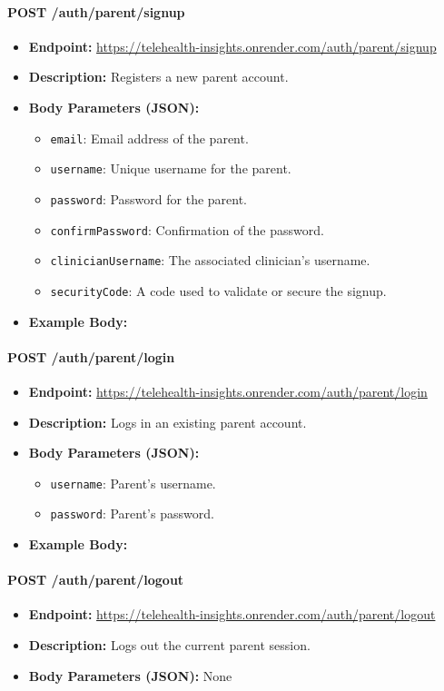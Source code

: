\documentclass{article}
\begin{document}
\paragraph{POST /auth/parent/signup}
\begin{itemize}
    \item \textbf{Endpoint:} 
        \url{https://telehealth-insights.onrender.com/auth/parent/signup}
    \item \textbf{Description:} Registers a new parent account.
    \item \textbf{Body Parameters (JSON):}
    \begin{itemize}
        \item \texttt{email}: Email address of the parent.
        \item \texttt{username}: Unique username for the parent.
        \item \texttt{password}: Password for the parent.
        \item \texttt{confirmPassword}: Confirmation of the password.
        \item \texttt{clinicianUsername}: The associated clinician’s username.
        \item \texttt{securityCode}: A code used to validate or secure the signup.
    \end{itemize}
    \item \textbf{Example Body:}
\end{itemize}

\paragraph{POST /auth/parent/login}
\begin{itemize}
    \item \textbf{Endpoint:} 
        \url{https://telehealth-insights.onrender.com/auth/parent/login}
    \item \textbf{Description:} Logs in an existing parent account.
    \item \textbf{Body Parameters (JSON):}
    \begin{itemize}
        \item \texttt{username}: Parent’s username.
        \item \texttt{password}: Parent’s password.
    \end{itemize}
    \item \textbf{Example Body:}
\end{itemize}

\paragraph{POST /auth/parent/logout}
\begin{itemize}
    \item \textbf{Endpoint:} 
        \url{https://telehealth-insights.onrender.com/auth/parent/logout}
    \item \textbf{Description:} Logs out the current parent session.
    \item \textbf{Body Parameters (JSON):} None
\end{itemize}
\end{document}
